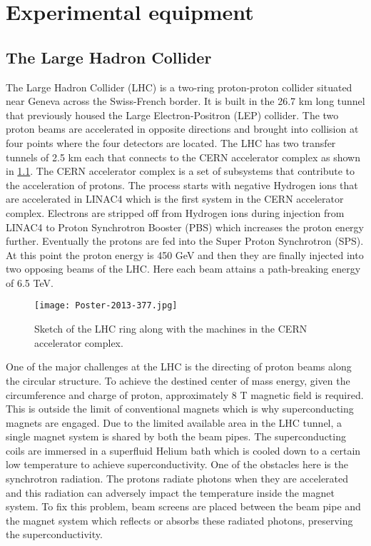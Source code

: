 
\chapter{Experimental equipment}
\label{sec:LHCATLAS}

\section{The Large Hadron Collider}
The Large Hadron Collider (LHC)\cite{LyndonEvans_2008} is a two-ring proton-proton collider situated near Geneva across the Swiss-French border. It is built in 
the 26.7 km long tunnel that previously housed the Large Electron-Positron (LEP) collider. The two proton beams are accelerated in opposite directions and 
brought into collision at four points where the four detectors are located. The LHC has two transfer tunnels of 2.5 km each that connects to the CERN accelerator
complex as shown in \cref{fig:acc_complex}. The CERN accelerator complex is a set of subsystems that contribute to the acceleration of protons. The process 
starts with negative Hydrogen ions that are accelerated in LINAC4 which is the first system in the CERN accelerator complex. Electrons are stripped off from 
Hydrogen ions during injection from LINAC4 to Proton Synchrotron Booster (PBS) which increases the proton energy further. Eventually the protons are fed into 
the Super Proton Synchrotron (SPS). At this point the proton energy is 450 GeV and then they are finally injected into two opposing beams of the LHC. Here each beam 
attains a path-breaking energy of 6.5 TeV. 

\begin{figure}[htbp]
    \centering
    \texttt{[image: Poster-2013-377.jpg]}
    \caption[Sketch of the CERN accelerator complex]{Sketch of the LHC ring along with the machines in the CERN accelerator complex\cite{Haffner:1621894}.}%
    \label{fig:acc_complex}
\end{figure}


One of the major challenges at the LHC is the directing of proton beams along the circular structure. To achieve the destined center of mass energy, 
given the circumference and charge of proton, approximately 8 T magnetic field is required. This is outside the limit of conventional magnets which is why 
superconducting magnets are engaged. Due to the limited available area in the LHC tunnel, a single magnet system is shared by both the beam pipes. The 
superconducting coils are immersed in a superfluid Helium bath which is cooled down to a certain low temperature to achieve superconductivity. One of the 
obstacles here is the synchrotron radiation. The protons radiate photons when they are accelerated and this radiation can adversely impact the temperature 
inside the magnet system. To fix this problem, beam screens are placed between the beam pipe and the magnet system which reflects or absorbs these radiated photons,
preserving the superconductivity. 


